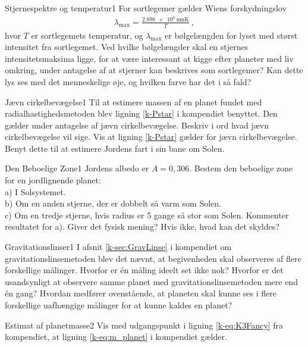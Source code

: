 %
%
\begin{opgave}{Stjernespektre og temperatur}{1}
For sortlegemer gælder Wiens forskydningslov
\begin{align*}
    \lambda_\text{max} = \frac{\SI{2.898e6}{\nano\metre\kelvin}}{T} \: ,
\end{align*}
hvor $T$ er sortlegemets temperatur, og $\lambda_\text{max}$ er bølgelængden for lyset med størst intensitet fra sortlegemet. 
\opg Ved hvilke bølgelængder skal en stjernes intensitetsmaksima ligge, for at være interessant at kigge efter planeter med liv omkring, under antagelse af at stjerner kan beskrives som sortlegemer?
\opg Kan dette lys ses med det menneskelige øje, og hvilken farve har det i så fald?
\end{opgave}
%
%
\begin{opgave}{Jævn cirkelbevægelse}{1}
Til at estimere massen af en planet fundet med radialhastighedsmetoden blev ligning \eqref{k-Pstar} i kompendiet benyttet. Den gælder under antagelse af jævn cirkelbevægelse.
\opg Beskriv i ord hvad jævn cirkelbevægelse vil sige.
\opg Vis at ligning \eqref{k-Pstar} gælder for jævn cirkelbevægelse.
\opg Benyt dette til at estimere Jordens fart i sin bane om Solen.
\end{opgave}
%
%
\begin{opgave}{Den Beboelige Zone}{1}
Jordens albedo er $A = 0,306$.
\opg Bestem den beboelige zone for en jordlignende planet: \\
a) \; I Solsystemet. \\
b) \; Om en anden stjerne, der er dobbelt så varm som Solen. \\
c) \; Om en tredje stjerne, hvis radius er 5 gange så stor som Solen.
\opg Kommenter resultatet for a). Giver det fysisk mening? Hvis ikke, hvad kan det skyldes?
\end{opgave}
%
%
\begin{opgave}{Gravitationslinser}{1}
I afsnit \ref{k-sec:GravLinse} i kompendiet om gravitationslinsemetoden blev det nævnt, at begivenheden skal observeres af flere forskellige målinger.
\opg Hvorfor er én måling ideelt set ikke nok?
\opg Hvorfor er det usandsynligt at observere samme planet med gravitationslinsemetoden mere end én gang?
\opg Hvordan medfører ovenstående, at planeten skal kunne ses i flere forskellige uafhængige målinger for at kunne kaldes en planet?
\end{opgave}
%
%
\begin{opgave}{Estimat af planetmasse}{2}
Vis med udgangspunkt i ligning \eqref{k-eq:K3Fancy} fra kompendiet, at ligning \eqref{k-eq:m_planet} i kompendiet gælder.
\end{opgave}
